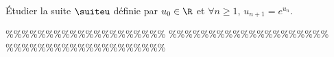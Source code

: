 



\begin{exercice} \;
\'Etudier la suite $\suiteu$ d\'efinie par  $u_0\in \R$ et $\forall n \geq 1$, $u_{n+1}=e^{u_n}.$
%
\end{exercice}


\%\%\%\%\%\%\%\%\%\%\%\%\%\%\%\%\%\%\%\%
\%\%\%\%\%\%\%\%\%\%\%\%\%\%\%\%\%\%\%\%
\%\%\%\%\%\%\%\%\%\%\%\%\%\%\%\%\%\%\%\%




